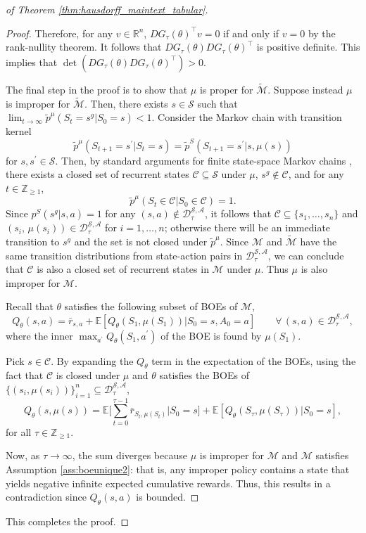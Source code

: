 \documentclass{amsart}
\begin{document}
\begin{proof}[of Theorem \ref{thm:hausdorff_maintext_tabular}]
\begin{proof}
Therefore, for any $v \in \mathbb{R}^n$, $DG_\tau(\theta)^\top v=0$ if and only if $v=0$ by the rank-nullity theorem. It follows that $DG_\tau(\theta) DG_\tau(\theta)^\top$ is positive definite. This implies that $\det(DG_\tau(\theta)DG_\tau(\theta)^\top) > 0$.


The final step in the proof is to show that $\mu$ is proper for $\widetilde{\mathcal{M}}$.
 Suppose instead $\mu$ is improper for $\widetilde{\mathcal{M}}$. Then, there exists $s \in \mathcal{S}$ such that $\lim_{t \rightarrow \infty} \tilde{p}^\mu(S_t=s^g|S_0=s)<1$. Consider the Markov chain with transition kernel 
 $$\tilde{p}^{\mu}(S_{t+1}=s^\prime|S_t=s)=\tilde{p}^S(S_{t+1}=s^\prime| s,\mu(s) )$$ for $s,s^\prime \in \mathcal{S}$. Then,  by standard arguments for finite state-space Markov chains \citep{markovchain}, there exists a closed set of recurrent states $\mathcal{C} \subseteq \mathcal{S}$ under $\mu$, $s^g \notin \mathcal{C}$, and for any $t \in \mathbb{Z}_{\geq 1}$,
 $$\tilde{p}^\mu(S_t \in \mathcal{C}|S_0 \in \mathcal{C})=1.$$
 Since $p^S(s^g|s,a)=1$ for any $(s,a) \notin \mathcal{D}^{\mathcal{S},\mathcal{A}}_\tau$, it follows that $\mathcal{C} \subseteq \{s_1,\dots,s_n\}$ and $(s_i,\,\mu(s_i)) \in \mathcal{D}^{\mathcal{S},\mathcal{A}}_\tau$ for $i=1,\ldots,n$; otherwise  there will be an immediate transition to $s^g$ and the set is not closed under $\tilde{p}^\mu$. Since $\mathcal{M}$ and $\widetilde{\mathcal{M}}$ have the same transition distributions from state-action pairs in $\mathcal{D}_\tau^{\mathcal{S},\mathcal{A}}$, we can conclude that $\mathcal{C}$ is also a closed set of recurrent states in $\mathcal{M}$ under $\mu$. Thus $\mu$ is also improper for $\mathcal{M}$.

 Recall that $\theta$ satisfies the following subset of BOEs of $\mathcal{M}$,
 $$Q_\theta(s,a) = \bar{r}_{s,a} + \mathbb{E}[Q_\theta(S_1,\mu(S_1))|S_0=s,A_0=a] \qquad \forall \, (s,a) \in \mathcal{D}_\tau^{\mathcal{S},\mathcal{A}},$$ where the inner {\it $\max_{a^\prime} Q_\theta(S_1,a^\prime)$} of the BOE is found by  $\mu(S_1)$.

Pick $s \in \mathcal{C}$. By expanding the $Q_{\theta}$ term in the expectation of the BOEs, using the fact that $\mathcal{C}$ is closed under $\mu$ and $\theta$ satisfies the BOEs of $\{(s_i,\mu(s_i))\}_{i=1}^n \subseteq \mathcal{D}_\tau^{\mathcal{S},\mathcal{A}}$,
\begin{equation*}
Q_\theta(s,\mu(s))=\mathbb{E}\Bigg[\sum_{t=0}^{\tau-1} \bar{r}_{S_t,\mu(S_t)}\Bigg|S_0=s\Bigg]+\mathbb{E}[Q_\theta(S_\tau,\mu(S_\tau))|S_0=s],
\end{equation*}
for all $\tau \in \mathbb{Z}_{\geq 1}$.

Now, as $\tau \rightarrow \infty$, the sum diverges because $\mu$ is improper for $\mathcal{M}$ and $\mathcal{M}$ satisfies Assumption \ref{ass:boeunique2}: that is, any improper policy contains a state that yields negative infinite expected cumulative rewards. Thus, this results in a contradiction since $Q_\theta(s,a)$ is bounded.
\end{proof}
This completes the proof.
\end{proof}
\end{document}
